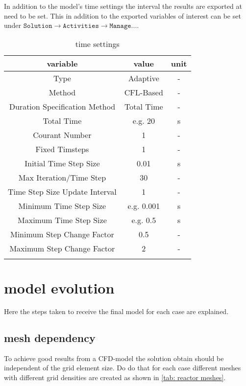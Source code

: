 \documentclass[../thesis.tex]{subfiles}
\begin{document}
In addition to the model's time settings the interval the results are exported at need to be set. This in addition to the exported variables of interest can be set under $\texttt{Solution} \rightarrow \texttt{Activities} \rightarrow \texttt{Manage...}$.

\begin{table} [htb]
	\centering
	\caption{time settings}
	\begin{tabular}{ ccc }
		\hline
		variable & value & unit \\
		\hline
		Type & Adaptive & - \\
		Method & CFL-Based & - \\
		Duration Specification Method & Total Time & -\\
		Total Time & e.g. 20 & s \\
		Courant Number & 1 & - \\
		Fixed Timsteps & 1 & - \\
		Initial Time Step Size & 0.01 & s \\
		Max Iteration/Time Step & 30 & - \\
		Time Step Size Update Interval & 1 & - \\
		Minimum Time Step Size & e.g. 0.001 & s \\
		Maximum Time Step Size & e.g. 0.5 & s \\
		Minimum Step Change Factor & 0.5 & - \\
		Maximum Step Change Factor & 2 & - \\		
		\hline
		\label{tab:ansys_setup_time}
	\end{tabular}
\end{table}

\section{model evolution}
\label{sec: mod_evol}

Here the steps taken to receive the final model for each case are explained.

\subsection{mesh dependency}
\label{sec: mesh_dep}

To achieve good results from a CFD-model the solution obtain should be independent of the grid element size. 
Do do that for each case different meshes with different grid densities are created as shown in \autoref{tab: reactor meshes}.
\end{document}
